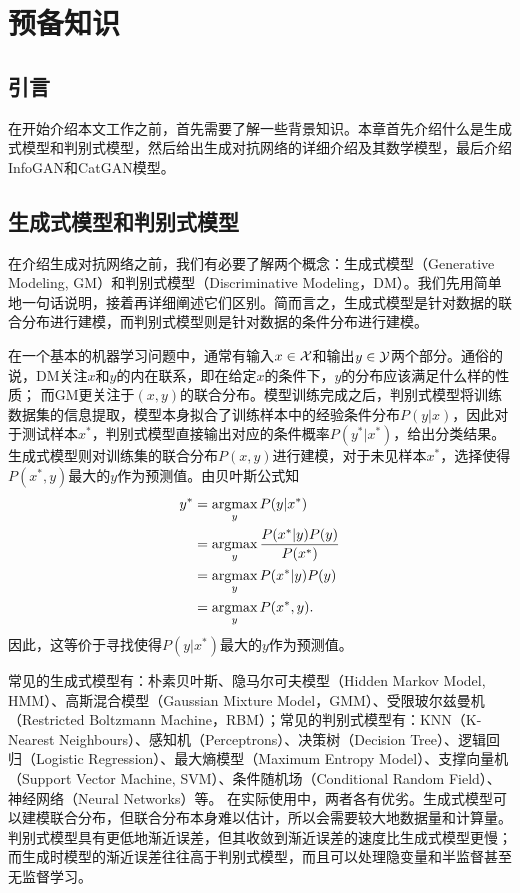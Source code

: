 \chapter{预备知识}\label{chap:preliminaries}
\section{引言}
在开始介绍本文工作之前，首先需要了解一些背景知识。本章首先介绍什么是生成式模型和判别式模型，然后给出生成对抗网络的详细介绍及其数学模型，最后介绍InfoGAN和CatGAN模型。

\section{生成式模型和判别式模型}\label{sec:gm-dm}
在介绍生成对抗网络之前，我们有必要了解两个概念：生成式模型（Generative Modeling, GM）和判别式模型（Discriminative Modeling，DM）。我们先用简单地一句话说明，接着再详细阐述它们区别。简而言之，生成式模型是针对数据的联合分布进行建模，而判别式模型则是针对数据的条件分布进行建模。

在一个基本的机器学习问题中，通常有输入$x \in \mathcal{X}$和输出$y \in \mathcal{Y}$两个部分。通俗的说，DM关注$x$和$y$的内在联系，即在给定$x$的条件下，$y$的分布应该满足什么样的性质；
而GM更关注于$(x, y)$的联合分布。模型训练完成之后，判别式模型将训练数据集的信息提取，模型本身拟合了训练样本中的经验条件分布$P(y|x)$，因此对于测试样本$x^*$，判别式模型直接输出对应的条件概率$P(y^* | x^*)$，给出分类结果。生成式模型则对训练集的联合分布$P(x,y)$进行建模，对于未见样本$x^*$，选择使得$P(x^*, y)$最大的$y$作为预测值。由贝叶斯公式知
\[
  \begin{split}
    y^{*} &= \mathop{\text{argmax}}_y P(y|x^{*}) \\
       &= \mathop{\text{argmax}}_y \frac{P(x^*|y)P(y)}{P(x^*)} \\
       &= \mathop{\text{argmax}}_y P(x^*|y)P(y) \\
       &= \mathop{\text{argmax}}_y P(x^*, y).
  \end{split}
\]
因此，这等价于寻找使得$P(y|x^*)$最大的$y$作为预测值。

常见的生成式模型有：朴素贝叶斯、隐马尔可夫模型（Hidden Markov Model, HMM）、高斯混合模型（Gaussian Mixture Model，GMM）、受限玻尔兹曼机（Restricted Boltzmann Machine，RBM）；常见的判别式模型有：KNN（K-Nearest Neighbours）、感知机（Perceptrons）、决策树（Decision Tree）、逻辑回归（Logistic Regression）、最大熵模型（Maximum Entropy Model）、支撑向量机（Support Vector Machine, SVM）、条件随机场（Conditional Random Field）、神经网络（Neural Networks）等。
在实际使用中，两者各有优劣。生成式模型可以建模联合分布，但联合分布本身难以估计，所以会需要较大地数据量和计算量。判别式模型具有更低地渐近误差，但其收敛到渐近误差的速度比生成式模型更慢；而生成时模型的渐近误差往往高于判别式模型\citep{ng2002discriminative}，而且可以处理隐变量和半监督甚至无监督学习。


